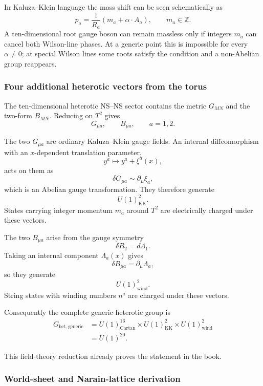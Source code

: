 \documentclass[
  10pt,
  a4paper,
  openany]{book}
\begin{document}
In Kaluza--Klein language the mass shift can be seen schematically as \[
p_a
=\frac1{R_a}
\left(
m_a+\alpha\cdot A_a
\right),
\qquad
m_a\in\mathbb Z.
\] A ten-dimensional root gauge boson can remain massless only if
integers \(m_a\) can cancel both Wilson-line phases. At a generic point
this is impossible for every \(\alpha\neq0\); at special Wilson lines
some roots satisfy the condition and a non-Abelian group reappears.

\subsubsection{Four additional heterotic vectors from the
torus}\label{four-additional-heterotic-vectors-from-the-torus}

The ten-dimensional heterotic NS--NS sector contains the metric
\(G_{MN}\) and the two-form \(B_{MN}\). Reducing on \(T^2\) gives \[
G_{\mu a},
\qquad
B_{\mu a},
\qquad
a=1,2.
\]

The two \(G_{\mu a}\) are ordinary Kaluza--Klein gauge fields. An
internal diffeomorphism with an \(x\)-dependent translation parameter,
\[
y^a\longmapsto y^a+\xi^a(x),
\] acts on them as \[
\delta G_{\mu a}\sim\partial_\mu\xi_a,
\] which is an Abelian gauge transformation. They therefore generate \[
U(1)^2_{\mathrm{KK}}.
\] States carrying integer momentum \(m_a\) around \(T^2\) are
electrically charged under these vectors.

The two \(B_{\mu a}\) arise from the gauge symmetry \[
\delta B_2=d\Lambda_1.
\] Taking an internal component \(\Lambda_a(x)\) gives \[
\delta B_{\mu a}
=\partial_\mu\Lambda_a,
\] so they generate \[
U(1)^2_{\mathrm{wind}}.
\] String states with winding numbers \(n^a\) are charged under these
vectors.

Consequently the complete generic heterotic group is \[
\begin{aligned}
G_{\mathrm{het,generic}}
&=U(1)^{16}_{\mathrm{Cartan}}
\times U(1)^2_{\mathrm{KK}}
\times U(1)^2_{\mathrm{wind}}\\
&=\boxed{U(1)^{20}}.
\end{aligned}
\]

This field-theory reduction already proves the statement in the book.

\subsubsection{World-sheet and Narain-lattice
derivation}\label{world-sheet-and-narain-lattice-derivation}
\end{document}
